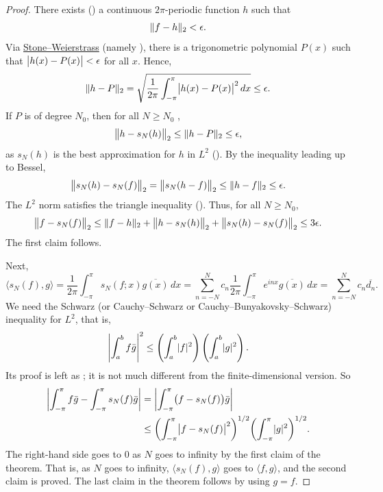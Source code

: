 \begin{proof}
There exists ()
a continuous $2\pi$-periodic function $h$ such that
\begin{equation*}
\lVert {f-h} \rVert_2 < \epsilon .
\end{equation*}
Via \hyperref[thm:SWcomplex]{Stone--Weierstrass}
(namely ),
there is a trigonometric polynomial $P(x)$
such that
$\bigl\lvert {h(x) - P(x)} \bigr\rvert < \epsilon$ for all $x$.
Hence,
\begin{equation*}
\lVert {h-P} \rVert_2
=
\sqrt{
\frac{1}{2\pi}
\int_{-\pi}^{\pi}
\bigl\lvert {h(x)-P(x)} \bigr\rvert^2
\,
dx
}
\leq \epsilon.
\end{equation*}
If $P$ is of degree $N_0$, then for all $N \geq N_0$ ,
\begin{equation*}
\bigl\lVert {h-s_N(h)} \bigr\rVert_2 \leq \lVert {h-P} \rVert_2 \leq \epsilon ,
\end{equation*}
as $s_N(h)$ is the best approximation for $h$ in $L^2$ ().
By the inequality leading up to Bessel,
\begin{equation*}
\bigl\lVert {s_N(h)-s_N(f)} \bigr\rVert_2
=
\bigl\lVert {s_N(h-f)} \bigr\rVert_2
\leq
\lVert {h-f} \rVert_2 \leq \epsilon .
\end{equation*}
The $L^2$ norm satisfies the triangle inequality
().
Thus, for all $N \geq N_0$,
\begin{equation*}
\bigl\lVert {f-s_N(f)} \bigr\rVert_2
\leq
\lVert {f-h} \rVert_2
+
\bigl\lVert {h-s_N(h)} \bigr\rVert_2
+
\bigl\lVert {s_N(h)-s_N(f)} \bigr\rVert_2
\leq 3\epsilon .
\end{equation*}
The first claim follows.

Next,
\begin{equation*}
\langle s_N(f) , g \rangle
=
\frac{1}{2\pi}
\int_{-\pi}^\pi
s_N(f;x) \overline{g(x)} \, dx
=
\sum_{n=-N}^N
c_n 
\frac{1}{2\pi}
\int_{-\pi}^\pi
e^{inx}
\overline{g(x)} \, dx
=
\sum_{n=-N}^N
c_n 
\overline{d_n} .
\end{equation*}
We need the Schwarz (or Cauchy--Schwarz or Cauchy--Bunyakovsky--Schwarz)
inequality for $L^2$, that is,
\begin{equation*}
{\left\lvert {\int_a^b f\bar{g}} \right\rvert}^2
\leq
\left( \int_a^b \lvert {f} \rvert^2 \right)
\left( \int_a^b \lvert {g} \rvert^2 \right) .
\end{equation*}
Its proof is left as ;
it is not much
different from the finite-dimensional version.
So
\begin{equation*}
\begin{split}
\left\lvert {\int_{-\pi}^\pi f\bar{g} - \int_{-\pi}^\pi s_N(f)\bar{g}} \right\rvert
& =
\left\lvert {\int_{-\pi}^\pi \bigl(f- s_N(f)\bigr)\bar{g}} \right\rvert \\
& \leq
{\left(\int_{-\pi}^\pi \bigl\lvert {f- s_N(f)} \bigr\rvert^2 \right)}^{1/2}
{\left( \int_{-\pi}^\pi \lvert {g} \rvert^2 \right)}^{1/2} .
\end{split}
\end{equation*}
The right-hand side goes to 0 as $N$ goes to infinity by the first
claim of the theorem.
That is, as $N$ goes to infinity, $\langle s_N(f),g \rangle$
goes to $\langle f,g \rangle$, and
the second claim is proved.  The last claim in the theorem follows by using
$g=f$.
\end{proof}


